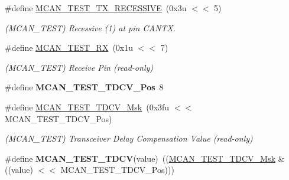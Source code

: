 \begin{DoxyCompactItemize}
\mbox{\label{group__SAMV71__MCAN_ga767740aee34ad9b9ab44748b8a35f1bc}} 
\#define \mbox{\hyperlink{group__SAMV71__MCAN_ga767740aee34ad9b9ab44748b8a35f1bc}{M\+C\+A\+N\+\_\+\+T\+E\+S\+T\+\_\+\+T\+X\+\_\+\+R\+E\+C\+E\+S\+S\+I\+VE}}~(0x3u $<$$<$ 5)
\begin{DoxyCompactList}\small\item\em (M\+C\+A\+N\+\_\+\+T\+E\+ST) Recessive (\textquotesingle{}1\textquotesingle{}) at pin C\+A\+N\+TX. \end{DoxyCompactList}\item 
\mbox{\label{group__SAMV71__MCAN_ga392a451f0deb62981e36c302aa0a0a49}} 
\#define \mbox{\hyperlink{group__SAMV71__MCAN_ga392a451f0deb62981e36c302aa0a0a49}{M\+C\+A\+N\+\_\+\+T\+E\+S\+T\+\_\+\+RX}}~(0x1u $<$$<$ 7)
\begin{DoxyCompactList}\small\item\em (M\+C\+A\+N\+\_\+\+T\+E\+ST) Receive Pin (read-\/only) \end{DoxyCompactList}\item 
\mbox{\label{group__SAMV71__MCAN_ga5f613821e3f233e6d48ff8585ffefa9d}} 
\#define {\bfseries M\+C\+A\+N\+\_\+\+T\+E\+S\+T\+\_\+\+T\+D\+C\+V\+\_\+\+Pos}~8
\item 
\mbox{\label{group__SAMV71__MCAN_gad2804cc2a94896b3afeb65ad7a67278e}} 
\#define \mbox{\hyperlink{group__SAMV71__MCAN_gad2804cc2a94896b3afeb65ad7a67278e}{M\+C\+A\+N\+\_\+\+T\+E\+S\+T\+\_\+\+T\+D\+C\+V\+\_\+\+Msk}}~(0x3fu $<$$<$ M\+C\+A\+N\+\_\+\+T\+E\+S\+T\+\_\+\+T\+D\+C\+V\+\_\+\+Pos)
\begin{DoxyCompactList}\small\item\em (M\+C\+A\+N\+\_\+\+T\+E\+ST) Transceiver Delay Compensation Value (read-\/only) \end{DoxyCompactList}\item 
\mbox{\label{group__SAMV71__MCAN_gaf1612c48b95f8ac1df7e6f88e44f8fc3}} 
\#define {\bfseries M\+C\+A\+N\+\_\+\+T\+E\+S\+T\+\_\+\+T\+D\+CV}(value)~((\mbox{\hyperlink{group__SAMV71__MCAN_gad2804cc2a94896b3afeb65ad7a67278e}{M\+C\+A\+N\+\_\+\+T\+E\+S\+T\+\_\+\+T\+D\+C\+V\+\_\+\+Msk}} \& ((value) $<$$<$ M\+C\+A\+N\+\_\+\+T\+E\+S\+T\+\_\+\+T\+D\+C\+V\+\_\+\+Pos)))
\item 
\mbox{\label{group__SAMV71__MCAN_ga48fcd6de8679ec388d8c13c00e1c68ec}} 

\end{DoxyCompactItemize}
